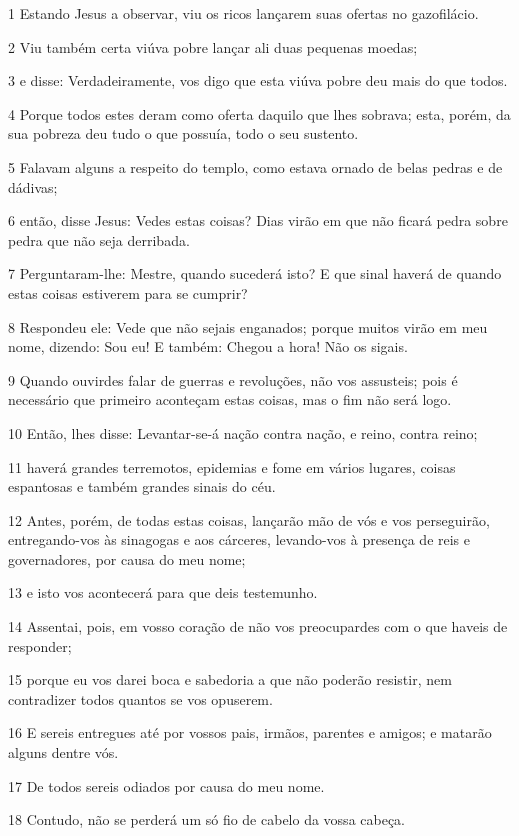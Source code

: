 \par 1 Estando Jesus a observar, viu os ricos lançarem suas ofertas no gazofilácio.
\par 2 Viu também certa viúva pobre lançar ali duas pequenas moedas;
\par 3 e disse: Verdadeiramente, vos digo que esta viúva pobre deu mais do que todos.
\par 4 Porque todos estes deram como oferta daquilo que lhes sobrava; esta, porém, da sua pobreza deu tudo o que possuía, todo o seu sustento.
\par 5 Falavam alguns a respeito do templo, como estava ornado de belas pedras e de dádivas;
\par 6 então, disse Jesus: Vedes estas coisas? Dias virão em que não ficará pedra sobre pedra que não seja derribada.
\par 7 Perguntaram-lhe: Mestre, quando sucederá isto? E que sinal haverá de quando estas coisas estiverem para se cumprir?
\par 8 Respondeu ele: Vede que não sejais enganados; porque muitos virão em meu nome, dizendo: Sou eu! E também: Chegou a hora! Não os sigais.
\par 9 Quando ouvirdes falar de guerras e revoluções, não vos assusteis; pois é necessário que primeiro aconteçam estas coisas, mas o fim não será logo.
\par 10 Então, lhes disse: Levantar-se-á nação contra nação, e reino, contra reino;
\par 11 haverá grandes terremotos, epidemias e fome em vários lugares, coisas espantosas e também grandes sinais do céu.
\par 12 Antes, porém, de todas estas coisas, lançarão mão de vós e vos perseguirão, entregando-vos às sinagogas e aos cárceres, levando-vos à presença de reis e governadores, por causa do meu nome;
\par 13 e isto vos acontecerá para que deis testemunho.
\par 14 Assentai, pois, em vosso coração de não vos preocupardes com o que haveis de responder;
\par 15 porque eu vos darei boca e sabedoria a que não poderão resistir, nem contradizer todos quantos se vos opuserem.
\par 16 E sereis entregues até por vossos pais, irmãos, parentes e amigos; e matarão alguns dentre vós.
\par 17 De todos sereis odiados por causa do meu nome.
\par 18 Contudo, não se perderá um só fio de cabelo da vossa cabeça.
